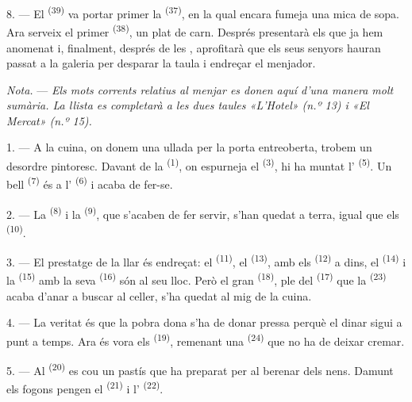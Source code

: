 8. --- El  \textsuperscript{(39)} va portar primer la
 \textsuperscript{(37)}, en la qual encara fumeja una mica de sopa.
Ara serveix el primer  \textsuperscript{(38)}, un plat de carn. Després
presentarà els que ja hem anomenat i, finalment, després de les
, aprofitarà que els seus senyors hauran passat a la galeria per
desparar la taula i endreçar el menjador.

\textit{Nota.} --- \textit{Els mots corrents relatius al menjar es donen aquí d'una manera
molt sumària. La llista es completarà a les dues taules «L'Hotel» (n.º 13) i «El Mercat» (n.º
15).}

\VUsaut{4.6mm}
\VUsaut{3.0mm}

1. --- A la cuina, on donem una ullada per la porta entreoberta, trobem un desordre pintoresc.
Davant de la  \textsuperscript{(1)}, on espurneja el 
\textsuperscript{(3)}, hi ha muntat l' \textsuperscript{(5)}. Un bell
 \textsuperscript{(7)} és a l' \textsuperscript{(6)} i acaba de
fer-se.

2. --- La  \textsuperscript{(8)} i la 
\textsuperscript{(9)}, que s'acaben de fer servir, s'han quedat a terra, igual que els
 \textsuperscript{(10)}.

3. --- El prestatge de la llar és endreçat: el  \textsuperscript{(11)}, el
 \textsuperscript{(13)}, amb els
 \textsuperscript{(12)} a dins, el 
\textsuperscript{(14)} i la  \textsuperscript{(15)} amb la seva
 \textsuperscript{(16)} són al seu lloc. Però el gran
 \textsuperscript{(18)}, ple del 
\textsuperscript{(17)} que la  \textsuperscript{(23)} acaba d'anar a buscar al
celler, s'ha quedat al mig de la cuina.

4. --- La veritat és que la pobra dona s'ha de donar pressa perquè el dinar sigui a punt a
temps. Ara és vora els  \textsuperscript{(19)}, remenant una 
\textsuperscript{(24)} que no ha de deixar cremar.

5. --- Al  \textsuperscript{(20)} es cou un pastís que ha preparat per al berenar
dels nens. Damunt els fogons pengen el  \textsuperscript{(21)} i
l' \textsuperscript{(22)}.

